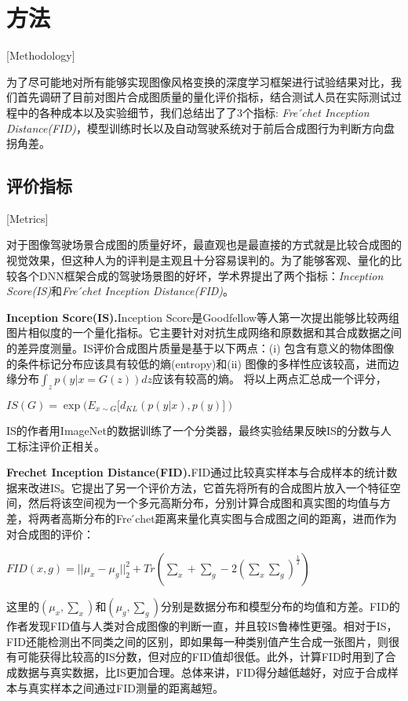 
\chapter{方法}[Methodology]

为了尽可能地对所有能够实现图像风格变换的深度学习框架进行试验结果对比，我们首先调研了目前对图片合成图质量的量化评价指标，结合测试人员在实际测试过程中的各种成本以及实验细节，我们总结出了了3个指标: \textit{Fre ́chet Inception Distance(FID)}\cite{FID}，模型训练时长以及自动驾驶系统对于前后合成图行为判断方向盘拐角差。

\section{评价指标}[Metrics]

对于图像驾驶场景合成图的质量好坏，最直观也是最直接的方式就是比较合成图的视觉效果，但这种人为的评判是主观且十分容易误判的。为了能够客观、量化的比较各个DNN框架合成的驾驶场景图的好坏，学术界提出了两个指标：\textit{Inception Score(IS)}\cite{IS}和\textit{Fre ́chet Inception Distance(FID)}\cite{FID}。

\textbf{Inception Score(IS).\cite{IS}}\quad Inception Score是Goodfellow等人第一次提出能够比较两组图片相似度的一个量化指标。它主要针对对抗生成网络和原数据和其合成数据之间的差异度测量。IS评价合成图片质量是基于以下两点：(i) 包含有意义的物体图像的条件标记分布应该具有较低的熵(entropy)和(ii) 图像的多样性应该较高，进而边缘分布$\int_z p(y|x=G(z))dz$应该有较高的熵。
将以上两点汇总成一个评分，
\begin{center}
    $IS(G)=\exp{(E_{x\sim G}[d_{KL}(p(y|x), p(y)])}$
\end{center}
IS的作者用ImageNet\cite{ImageNet}的数据训练了一个分类器，最终实验结果反映IS的分数与人工标注评价正相关。

\textbf{Frechet Inception Distance(FID).\cite{FID}}\quad FID通过比较真实样本与合成样本的统计数据来改进IS。它提出了另一个评价方法，它首先将所有的合成图片放入一个特征空间，然后将该空间视为一个多元高斯分布，分别计算合成图和真实图的均值与方差，将两者高斯分布的Fre ́chet距离来量化真实图与合成图之间的距离，进而作为对合成图的评价：
\begin{center}
    $FID(x,g)=||\mu_x-\mu_g||_2^2+Tr(\sum_x + \sum_g - 2(\sum_x\sum_g)^{\frac{1}{2}})$
\end{center}
这里的$(\mu_x,\sum_x)$和$(\mu_g,\sum_g)$分别是数据分布和模型分布的均值和方差。FID的作者发现FID值与人类对合成图像的判断一直，并且较IS\cite{IS}鲁棒性更强。相对于IS，FID还能检测出不同类之间的区别，即如果每一种类别值产生合成一张图片，则很有可能获得比较高的IS分数，但对应的FID值却很低。此外，计算FID时用到了合成数据与真实数据，比IS更加合理。总体来讲，FID得分越低越好，对应于合成样本与真实样本之间通过FID测量的距离越短。

